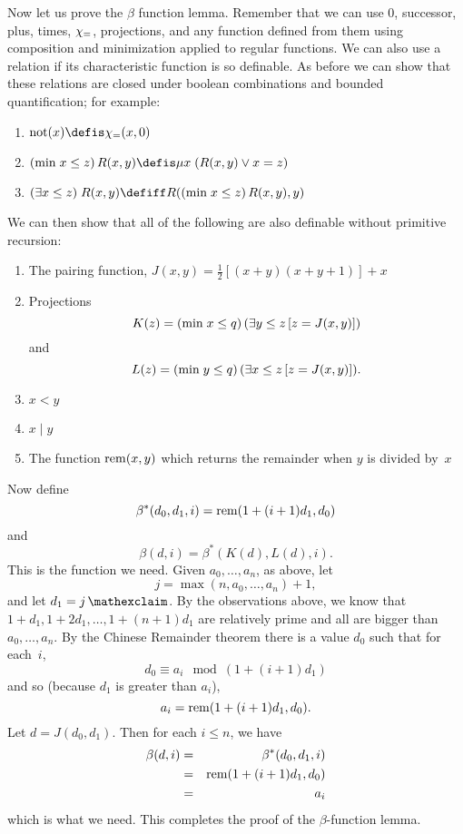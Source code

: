 \documentclass[../../../include/open-logic-section]{subfiles}
\begin{document}
Now let us prove the $\beta$ function lemma. Remember that we can use
$0$, successor, plus, times, $\chi_{=}$, projections, and any function
defined from them using composition and minimization applied to
regular functions. We can also use a relation if its characteristic
function is so definable. As before we can show that these relations
are closed under boolean combinations and bounded quantification; for
example:
\begin{enumerate}
\item $\fn{not}(x) \defis \Char{=}(x,0)$
\item $\bmin{x \leq z}{R(x,y)} \defis \umin{x}{(R(x,y) \lor x = z)}$
\item $\bexists{x \leq z}{R(x,y)} \defiff R(\bmin{x \leq z}{R(x,y)}, y)$
\end{enumerate}
We can then show that all of the following are also definable without
primitive recursion:
\begin{enumerate}
\item The pairing function, $J(x,y) = \frac{1}{2}[(x+y)(x+y+1)] + x$
\item Projections
\[
K(z) = \bmin{x \leq q}{(\lexists[y \leq z] \, [z = J(x,y)])}
\]
and
\[
L(z) = \bmin{y \leq q}{(\lexists[x \leq z]\, [z = J(x,y)])}.
\]
\item $x < y$
\item $x \mid y$
\item The function $\mathrm{rem}(x,y)$ which returns the remainder when
  $y$ is divided by~$x$
\end{enumerate}
Now define
\[
\beta^*(d_0,d_1,i) = \mathrm{rem}(1+(i+1) d_1,d_0)
\]
and
\[
\beta(d,i) = \beta^*(K(d),L(d),i).
\]
This is the function we need. Given $a_0,\dots,a_n$, as above, let
\[
j = \max(n,a_0,\dots,a_n)+1,
\]
and let $d_1 = \fact{j}$. By the observations above, we know that $1+d_1,
1+2 d_1, \dots, 1+(n+1) d_1$ are relatively prime and all are bigger
than $a_0,\dots,a_n$. By the Chinese Remainder theorem there is a
value $d_0$ such that for each~$i$,
\[
d_0 \equiv a_i \mod (1+(i+1)d_1)
\]
and so (because $d_1$ is greater than $a_i$),
\[
a_i = \mathrm{rem}(1+(i+1)d_1,d_0).
\]
Let $d = J(d_0,d_1)$. Then for each $i \le n$, we have
\begin{eqnarray*}
\beta(d,i) & = & \beta^*(d_0,d_1,i) \\
& = & \fn{rem}(1+(i+1) d_1,d_0) \\
& = & a_i
\end{eqnarray*}
which is what we need. This completes the proof of the
$\beta$-function lemma.
\end{document}
